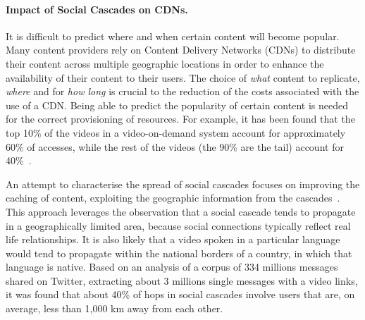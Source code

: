 \paragraph{Impact of Social Cascades on CDNs.}
It is difficult to predict where and when certain content will become popular.
Many content providers rely on Content Delivery Networks (CDNs) to distribute their content across
multiple geographic locations in order to enhance the availability of their content to their users. The
choice of \emph{what} content to replicate, \emph{where} and for \emph{how long} is crucial to the
reduction of the costs associated with the use of a CDN. Being able to predict the popularity of certain
content is needed for the correct provisioning of resources. For example, it has
been found that the top 10\% of the videos in a video-on-demand system account for approximately 60\% of
accesses, while the rest of the videos (\ie the 90\% are the tail) account for
40\%~\cite{buzztraq}.

An attempt to characterise the spread of social cascades focuses on improving the caching of
content, exploiting the geographic information from the cascades~\cite{socialcascades-salvo}.
This approach leverages the observation that a social cascade tends to propagate in a geographically
limited area, because social connections typically reflect real life relationships. It is
also likely that a video spoken in a particular language would tend to propagate within the national
borders of a country, in which that language is native. Based on an analysis of a corpus of 334 millions messages
shared on Twitter, extracting about 3 millions single messages with a video links, it was found that
about 40\% of hops in social cascades involve users that are, on average, less than 1,000 km away from
each other.

% 